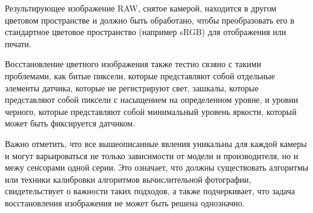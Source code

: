 
Результирующее изображение RAW, снятое камерой, находится в другом цветовом пространстве и должно быть обработано, чтобы преобразовать его в стандартное цветовое пространство (например sRGB) для отображения или печати. 

Восстановление цветного изображения также тестно свзяно с такими проблемами, как битые пиксели, которые представляют собой отдельные элементы датчика, которые не регистрируют свет, зашкалы, которые представляют собой пиксели с насыщением на определенном уровне, и уровни черного, которые представляют собой минимальный уровень яркости, который может быть фиксируется датчиком.



Важно отметить, что все вышеописанные явления уникальны для каждой камеры и могут варьироваться не только зависимости от модели и производителя, но и межу сенсорами одной серии. Это означает, что должны существовать алгоритмы или техники калибровки алгоритмов вычислительной фотографии, свидетельствует о важности таких подходов, а также подчеркивает, что задача восстановления изображения не может быть решена однозначно.